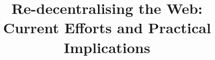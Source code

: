 \documentclass{acm_proc_article-sp}
\begin{document}
\title{Re-decentralising the Web: Current Efforts and Practical Implications}
%
%
%
%
%
\end{document}
